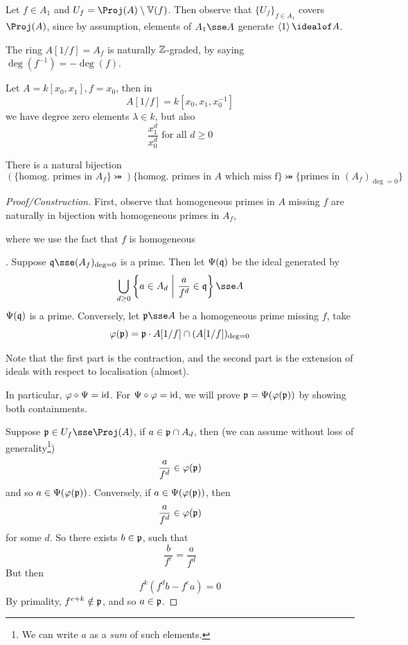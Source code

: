 \documentclass{article}
\begin{document}
Let \(f \in A_1\) and \(U_f = \Proj(A) \setminus \van(f)\). Then observe that \(\{U_f\}_{f \in A_1}\) covers \(\Proj(A)\), since by assumption, elements of \(A_1 \sse A\) generate \(\inner{1} \idealof A\).

The ring \(A[1/f] = A_f\) is naturally \(\mathbb{Z}\)-graded, by saying \(\deg(f^{-1}) = -\deg(f)\).

\begin{example}
    Let \(A = k[x_0, x_1], f = x_0\), then in
    \[A[1/f] = k[x_0, x_1, x_0^{-1}]\]
    we have degree zero elements \(\lambda \in k\), but also
    \[\frac{x_1^d}{x_0^d} \text{ for all }d \ge 0\]
\end{example}

\begin{proposition}
    There is a natural bijection
    \[\left(\{\text{homog. primes in }A_f\} \bij\right) \{\text{homog. primes in }A\text{ which miss f}\} \bij \{\text{primes in }(A_f)_{\deg=0}\}\]
\end{proposition}

\begin{proof}
    [Proof/Construction]
    
    First, observe that homogeneous primes in \(A\) missing \(f\) are naturally in bijection with homogeneous primes in \(A_f\), \begin{addendum}where we use the fact that \(f\) is homogeneous\end{addendum}. Suppose \(\mfq \sse (A_f)_{\deg = 0}\) is a prime. Then let \(\Psi(\mathfrak{q})\) be the ideal generated by
    \[\bigcup_{d \ge 0}\left\{a \in A_d \ \bigg\vert\ \frac{a}{f^d} \in \mfq\right\} \sse A\]
    \(\Psi(\mathfrak{q})\) is a prime. Conversely, let \(\mfp \sse A\) be a homogeneous prime missing \(f\), take
    \[\varphi(\mathfrak{p}) = \mathfrak{p} \cdot A[1/f] \cap (A[1/f])_{\deg = 0}\]

    Note that the first part is the contraction, and the second part is the extension of ideals with respect to localisation (almost).

    In particular, \(\varphi \circ \Psi = \operatorname{id}\). For \(\Psi \circ \varphi = \operatorname{id}\), we will prove \(\mathfrak{p} = \Psi(\varphi(\mathfrak{p}))\) by showing both containments.

    Suppose \(\mfp \in U_f \sse \Proj(A)\), if \(a \in \mathfrak{p} \cap A_d\), then (we can assume without loss of generality\footnote{We can write \(a\) as a \emph{sum} of such elements.})
    \[\frac{a}{f^d} \in \varphi(\mathfrak{p})\]
    and so \(a \in \Psi(\varphi(\mathfrak{p}))\). Conversely, if \(a \in \Psi(\varphi(\mathfrak{p}))\), then
    \[\frac{a}{f^d} \in \varphi(\mathfrak{p})\]
    for some \(d\). So there exists \(b \in \mathfrak{p}\), such that
    \[\frac{b}{f^e} = \frac{a}{f^d}\]
    But then
    \[f^k(f^d b - f^e a) = 0\]
    By primality, \(f^{e + k} \notin \mathfrak{p}\), and so \(a \in \mathfrak{p}\).
\end{proof}
\end{document}
